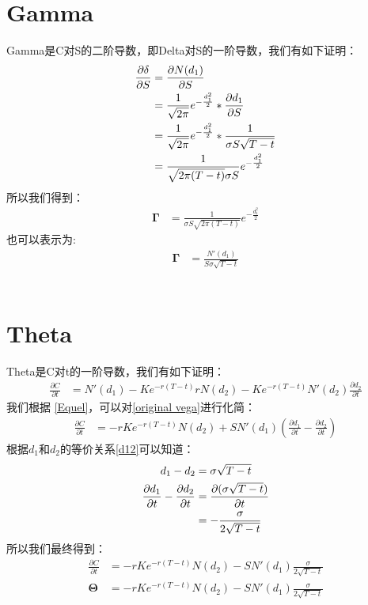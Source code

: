 \documentclass{ctexart}
\begin{document}
    \section{Gamma}   
    \noindent Gamma是C对S的二阶导数，即Delta对S的一阶导数，我们有如下证明：
    \begin{align}
         \frac{\partial \delta}{\partial S}  & = \frac{\partial N(d_1)}{\partial S}\notag \\
        & = \frac{1}{\sqrt{2\pi}}e^{-\frac{d^2_1}{2}}*\frac{\partial d_1}{\partial S}\notag \\
        & = \frac{1}{\sqrt{2\pi}}e^{-\frac{d^2_1}{2}}*\frac{1}{\sigma S \sqrt{T-t}}\notag \\
        & = \frac{1}{\sqrt{2\pi (T-t)}\sigma S}e^{-\frac{d^2_1}{2}}
    \end{align}
    所以我们得到：
    \begin{align}
        \boldsymbol{\Gamma} & = \frac{1}{\sigma S\sqrt{2\pi (T-t)}}e^{-\frac{d^2_1}{2}}
    \end{align}
    也可以表示为:
    \begin{align}
        \boldsymbol{\Gamma} & = \frac{N'(d_1)}{S\sigma\sqrt{T-t}}
    \end{align}\\
    
    \section{Theta}
    \noindent Theta是C对t的一阶导数，我们有如下证明：
    \begin{align}
        \frac{\partial C}{\partial t} & = N'(d_1)-Ke^{-r(T-t)}rN(d_2)-Ke^{-r(T-t)}N'(d_2)\frac{\partial d_2}{\partial t}\label{original vega}
    \end{align}
    我们根据 \eqref{Equel}，可以对\eqref{original vega}进行化简：
    \begin{align}
        \frac{\partial C}{\partial t} & = -rKe^{-r(T-t)}N(d_2)+SN'(d_1)\left(\frac{\partial d_1}{\partial t}-\frac{\partial d_2}{\partial t}\right)
    \end{align}
    根据$d_1$和$d_2$的等价关系\eqref{d12}可以知道：
    \begin{align}
        d_1-d_2 & = \sigma\sqrt{T-t}\\
        \frac{\partial d_1}{\partial t}-\frac{\partial d_2}{\partial t} & =\frac{\partial (\sigma \sqrt{T-t})}{\partial t}\notag\notag \\
        & = -\frac{\sigma}{2\sqrt{T-t}}
    \end{align}
    所以我们最终得到：
    \begin{align}
        \frac{\partial C}{\partial t} & = -rKe^{-r(T-t)}N(d_2) -SN'(d_1)\frac{\sigma}{2\sqrt{T-t}}\\
        \boldsymbol{\Theta} & = -rKe^{-r(T-t)}N(d_2) -SN'(d_1)\frac{\sigma}{2\sqrt{T-t}}
    \end{align}\\
    
\end{document}
